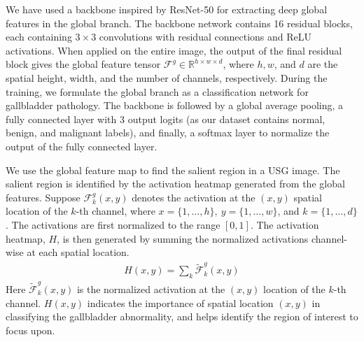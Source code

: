 %
We have used a backbone inspired by ResNet-50 \cite{resnet} for extracting deep global features in the global branch. The backbone network contains 16 residual blocks, each containing $3\times3$ convolutions with residual connections and ReLU activations. When applied on the entire image, the output of the final residual block gives the global feature tensor $\mathcal{F}^g \in \mathbb{R}^{h \times w \times d}$, where $h, w$, and $d$ are the spatial height, width, and the number of channels, respectively. During the training, we formulate the global branch as a classification network for gallbladder pathology. The backbone is followed by a global average pooling, a fully connected layer with 3 output logits (as our dataset contains normal, benign, and malignant labels), and finally, a softmax layer to normalize the output of the fully connected layer. 

%
We use the global feature map to find the salient region in a USG image. The salient region is identified by the activation heatmap generated from the global features. Suppose $\mathcal{F}^g_k(x,y)$ denotes the activation at the $(x,y)$ spatial location of the $k$-th channel, where $x=\{1,\ldots, h\},~ y=\{1,\ldots, w\}$, and $k=\{1,\ldots, d\}$. The activations are first normalized to the range $[0,1]$. The activation heatmap, $H$, is then generated by summing the normalized activations channel-wise at each spatial location. 
\begin{align}
    H(x,y) = \sum_k {\mathcal{\widetilde{F}}^g_k(x,y)}
\end{align}
Here $\mathcal{\widetilde{F}}^g_k(x,y)$ is the normalized activation at the $(x,y)$ location of the $k$-th channel. $H(x,y)$ indicates the importance of spatial location $(x,y)$ in classifying the gallbladder abnormality, and helps identify the region of interest to focus upon. 

